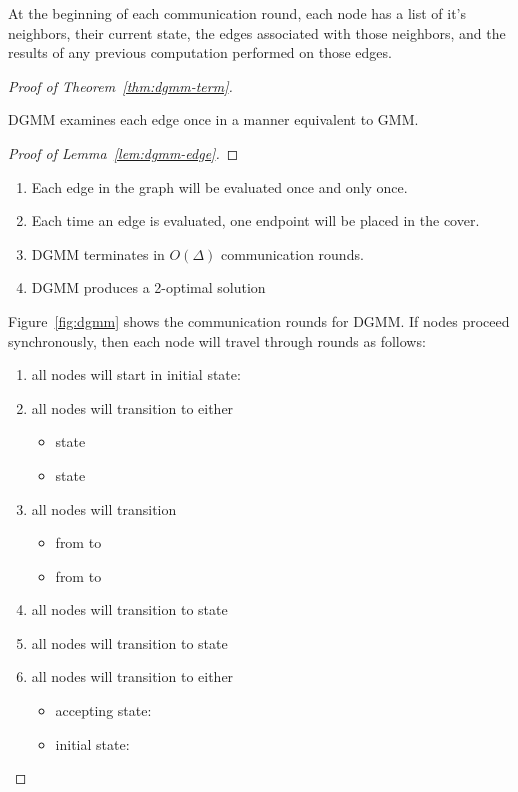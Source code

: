 \begin{note}
\label{not:dgmm-local-info}
At the beginning of each communication round, each node has a list of it's neighbors, their current state, the edges associated with those neighbors, and the results of any previous computation performed on those edges.
\end{note}\begin{proof}[Proof of Theorem~\ref{thm:dgmm-term}]
\label{prf:correct}

\begin{lem}
\label{lem:dgmm-edge}
  DGMM examines each edge once in a manner equivalent to GMM.
\end{lem}
\begin{proof}[Proof of Lemma~\ref{lem:dgmm-edge}]

\end{proof}

\begin{enumerate}
\item Each edge in the graph will be evaluated once and only once.
\item Each time an edge is evaluated, one endpoint will be placed in the cover.
\item DGMM terminates in $O(\Delta)$ communication rounds.
\item DGMM produces a 2-optimal solution
\end{enumerate}

Figure~\ref{fig:dgmm} shows the communication rounds for DGMM. If nodes proceed synchronously, then each node will travel through rounds as follows:
\begin{enumerate}
\item all nodes will start in initial state: \cCd
\item all nodes will transition to either 
  \begin{itemize} 
  \item state \cId
  \item state \cLd
  \end {itemize}
\item all nodes will transition
  \begin{itemize}
  \item from \cId to \cWd
  \item from \cLd to \cRd
  \end{itemize}
\item all nodes will transition to state \cUd
\item all nodes will transition to state \cEd
\item all nodes will transition to either
  \begin{itemize}
  \item accepting state: \cDd
  \item initial state: \cCd
  \end{itemize}
\end{enumerate}
\end{proof}

